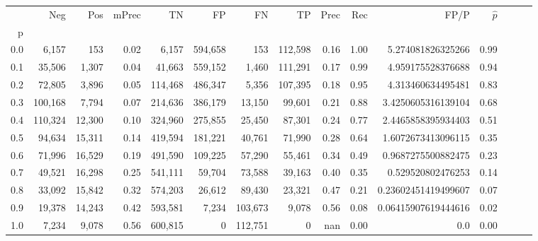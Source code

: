 \begin{tabular}{rrrrrrrrrrrrrrr}
\toprule
{} &      Neg &     Pos & mPrec &       TN &       FP &       FN &       TP &  Prec &   Rec &                 FP/P & $\hat{p}$ \\
p   &          &         &       &          &          &          &          &       &       &                      &           \\
\midrule
0.0 &    6,157 &     153 &  0.02 &    6,157 &  594,658 &      153 &  112,598 &  0.16 &  1.00 &    5.274081826325266 &      0.99 \\
0.1 &   35,506 &   1,307 &  0.04 &   41,663 &  559,152 &    1,460 &  111,291 &  0.17 &  0.99 &    4.959175528376688 &      0.94 \\
0.2 &   72,805 &   3,896 &  0.05 &  114,468 &  486,347 &    5,356 &  107,395 &  0.18 &  0.95 &    4.313460634495481 &      0.83 \\
0.3 &  100,168 &   7,794 &  0.07 &  214,636 &  386,179 &   13,150 &   99,601 &  0.21 &  0.88 &   3.4250605316139104 &      0.68 \\
0.4 &  110,324 &  12,300 &  0.10 &  324,960 &  275,855 &   25,450 &   87,301 &  0.24 &  0.77 &   2.4465858395934403 &      0.51 \\
0.5 &   94,634 &  15,311 &  0.14 &  419,594 &  181,221 &   40,761 &   71,990 &  0.28 &  0.64 &   1.6072673413096115 &      0.35 \\
0.6 &   71,996 &  16,529 &  0.19 &  491,590 &  109,225 &   57,290 &   55,461 &  0.34 &  0.49 &   0.9687275500882475 &      0.23 \\
0.7 &   49,521 &  16,298 &  0.25 &  541,111 &   59,704 &   73,588 &   39,163 &  0.40 &  0.35 &    0.529520802476253 &      0.14 \\
0.8 &   33,092 &  15,842 &  0.32 &  574,203 &   26,612 &   89,430 &   23,321 &  0.47 &  0.21 &  0.23602451419499607 &      0.07 \\
0.9 &   19,378 &  14,243 &  0.42 &  593,581 &    7,234 &  103,673 &    9,078 &  0.56 &  0.08 &  0.06415907619444616 &      0.02 \\
1.0 &    7,234 &   9,078 &  0.56 &  600,815 &        0 &  112,751 &        0 &   nan &  0.00 &                  0.0 &      0.00 \\
\bottomrule
\end{tabular}
